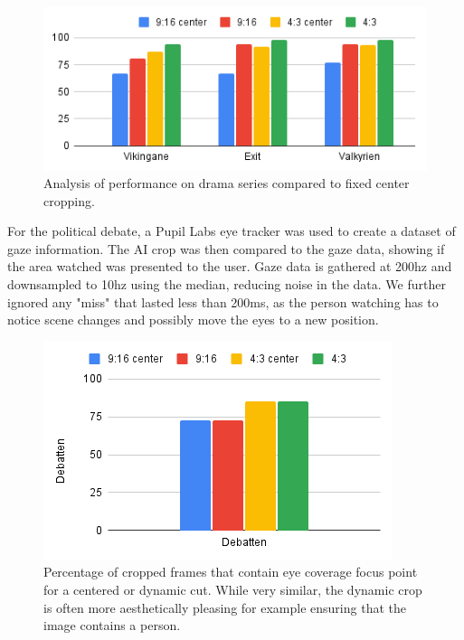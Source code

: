 \documentclass[sigconf, review=true]{acmart}
\begin{document}
\begin{figure}
\begin{center}
\includegraphics[width=0.9\columnwidth]{generic_ai_comparison.png}
\caption{Analysis of performance on drama series compared to fixed center
 cropping.}
\label{generic_ai_comparison}
\end{center}
\end{figure}

For the political debate, a Pupil Labs eye tracker was used to create a
dataset of gaze information. The AI crop was then compared to the gaze data,
showing if the area watched was presented to the user. Gaze data is gathered
at 200hz and downsampled to 10hz using the median, reducing noise in the
data. We further ignored any "miss" that lasted less than 200ms, as the
person watching has to notice scene changes and possibly move the eyes to a
new position. 

\begin{figure}
\begin{center}
\includegraphics[width=1\columnwidth]{CoverageOfEyeTracking.png}
\caption{Percentage of cropped frames that contain eye coverage focus point
 for a centered or dynamic cut. While very similar, the dynamic crop is often
 more aesthetically pleasing for example ensuring that the image contains a
 person.}
\label{debatten_plot}
 \end{center}
\end{figure}
\end{document}
